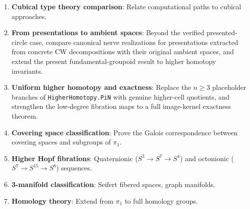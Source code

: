 \documentclass{lmcs}
\theoremstyle{definition}
\theoremstyle{plain}
\theoremstyle{remark}
\newcommand{\piOne}{\pi_1}
\begin{document}
\begin{enumerate}
    \item \textbf{Cubical type theory comparison}: Relate computational paths to cubical approaches.

    \item \textbf{From presentations to ambient spaces}: Beyond the verified
    presented-circle case, compare canonical nerve realizations for presentations
    extracted from concrete CW decompositions with their original ambient spaces,
    and extend the present fundamental-groupoid result to higher homotopy
    invariants.

    \item \textbf{Uniform higher homotopy and exactness}: Replace the
    $n\geq3$ placeholder branches of \texttt{HigherHomotopy.PiN} with genuine
    higher-cell quotients, and strengthen the low-degree fibration maps to a
    full image-kernel exactness theorem.

    \item \textbf{Covering space classification}: Prove the Galois correspondence between covering spaces and subgroups of $\piOne$.

    \item \textbf{Higher Hopf fibrations}: Quaternionic
    ($S^3 \to S^7 \to S^4$) and octonionic
    ($S^7 \to S^{15} \to S^8$) sequences.

    \item \textbf{3-manifold classification}: Seifert fibered spaces, graph manifolds.

    \item \textbf{Homology theory}: Extend from $\piOne$ to full homology groups.
\end{enumerate}
\end{document}
